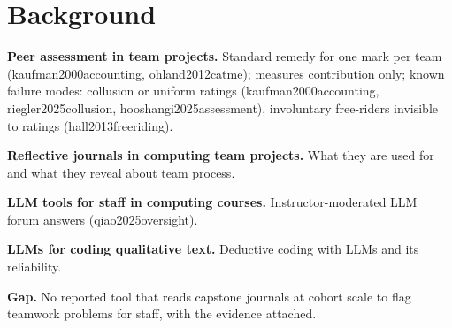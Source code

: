 \section{Background}
\label{sec:background}

\begin{outline}
  \item \textbf{Peer assessment in team projects.} Standard remedy for one mark per team
    (kaufman2000accounting, ohland2012catme); measures contribution only; known failure
    modes: collusion or uniform ratings (kaufman2000accounting, riegler2025collusion,
    hooshangi2025assessment), involuntary free-riders invisible to ratings
    (hall2013freeriding).
  \item \textbf{Reflective journals in computing team projects.} What they are used for and
    what they reveal about team process. 
  \item \textbf{LLM tools for staff in computing courses.} Instructor-moderated LLM
    forum answers (qiao2025oversight).
  \item \textbf{LLMs for coding qualitative text.} Deductive coding with LLMs and its
    reliability. 
  \item \textbf{Gap.} No reported tool that reads capstone journals at cohort scale to flag
    teamwork problems for staff, with the evidence attached. 
\end{outline}
